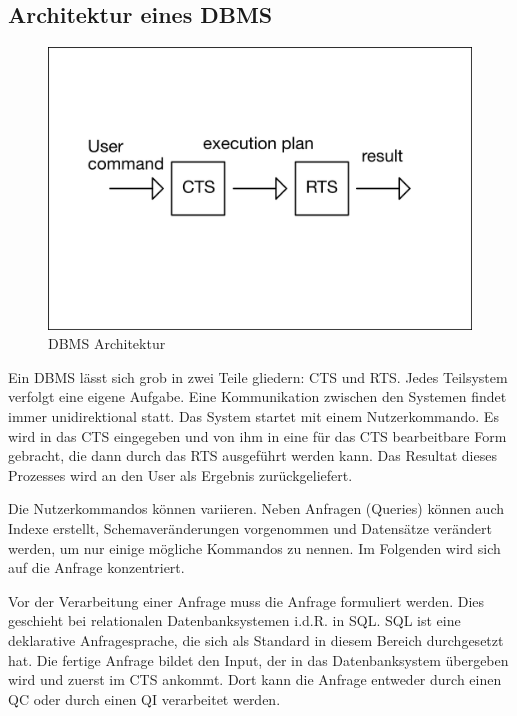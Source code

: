 \subsection{Architektur eines \ac{DBMS}}



\begin{figure}[h]
  \centering
  \includegraphics[width=\textwidth]{02_Grundlagen/DBMS_Architecture.png}
  \caption{\ac{DBMS} Architektur}
  \label{SearchSpace}
\end{figure}


Ein \ac{DBMS} lässt sich grob in zwei Teile gliedern: \ac{CTS} und \ac{RTS}. Jedes Teilsystem verfolgt eine eigene Aufgabe. Eine Kommunikation zwischen den Systemen findet immer unidirektional statt. Das System startet mit einem Nutzerkommando. Es wird in das \ac{CTS} eingegeben und von ihm in eine für das \ac{CTS} bearbeitbare Form gebracht, die dann durch das \ac{RTS} ausgeführt werden kann. Das Resultat dieses Prozesses wird an den User als Ergebnis zurückgeliefert.

Die Nutzerkommandos können variieren. Neben Anfragen (Queries) können auch Indexe erstellt, Schemaveränderungen vorgenommen und Datensätze verändert werden, um nur einige mögliche Kommandos zu nennen. Im Folgenden wird sich auf die Anfrage konzentriert.

Vor der Verarbeitung einer Anfrage muss die Anfrage formuliert werden. Dies geschieht bei relationalen Datenbanksystemen i.d.R. in \ac{SQL}. \ac{SQL} ist eine deklarative Anfragesprache, die sich als Standard in diesem Bereich durchgesetzt hat. Die fertige Anfrage bildet den Input, der in das Datenbanksystem übergeben wird und zuerst im \ac{CTS} ankommt. Dort kann die Anfrage entweder durch einen \ac{QC} oder durch einen \ac{QI} verarbeitet werden.

